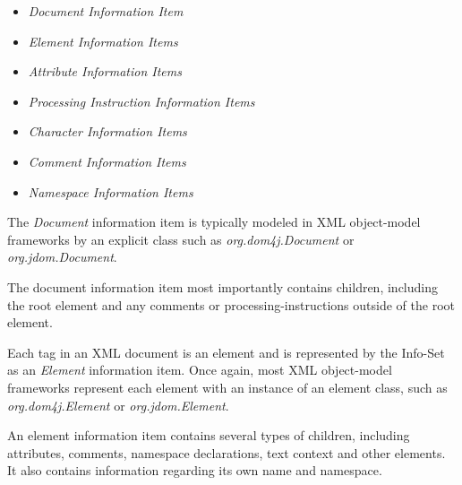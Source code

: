 \documentclass[20pt,landscape,headrule,footrule]{foils}
\begin{document}
\begin{minipage}{\textwidth}
\small
\begin{itemize}
  \item \emph{Document Information Item}
  \item \emph{Element Information Items}
  \item \emph{Attribute Information Items}
  \item \emph{Processing Instruction Information Items}
  \item \emph{Character Information Items}
  \item \emph{Comment Information Items}
  \item \emph{Namespace Information Items}
\end{itemize}
\end{minipage}



The \emph{Document} information item is typically modeled in
XML object-model frameworks by an explicit class such as  
\emph{org.dom4j.Document} or \emph{org.jdom.Document}.

The document information item most importantly contains children,
including the root element and any comments or processing-instructions
outside of the root element.




Each tag in an XML document is an element and is represented by the
Info-Set as an \emph{Element} information item.  Once again,
most XML object-model frameworks represent each element with an
instance of an element class, such as \emph{org.dom4j.Element}
or \emph{org.jdom.Element}.

An element information item contains several types of children,
including attributes, comments, namespace declarations, text context 
and other elements.  It also contains information regarding its own
name and namespace.

\begin{codelisting}
\end{codelisting}
\end{document}
